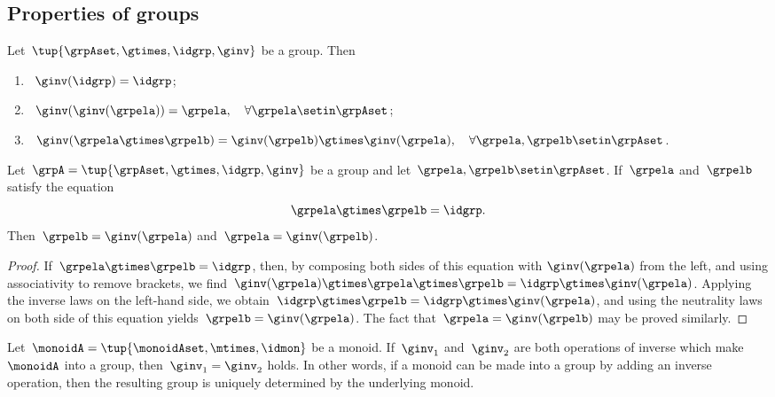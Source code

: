 
\subsection{Properties of groups}

\begin{lemma}
    \label{lem:inv-op-properties}
    Let~$\tup{\grpAset, \gtimes, \idgrp, \ginv}$ be a group.
    Then
    \begin{enumerate}
        \item\label{eq:group-neutral-invariant}~$\ginv(\idgrp) = \idgrp$;
        \item\label{eq:group-inverse-inverse}~$ \ginv(\ginv(\grpela)) = \grpela, \quad \forall \grpela \setin \grpAset$;
        \item\label{eq:group-inverse-of-composition}~$\ginv(\grpela \gtimes \grpelb ) = \ginv(\grpelb) \gtimes \ginv(\grpela), \quad \forall \grpela, \grpelb \setin \grpAset$.
    \end{enumerate}
\end{lemma}

\begin{lemma}
    \label{lem:inv-op-unique}
    Let~$\grpA = \tup{ \grpAset, \gtimes, \idgrp, \ginv }$ be a group and let~$\grpela, \grpelb \setin \grpAset$.
    If~$\grpela$ and~$\grpelb$ satisfy the equation
    \begin{equation}
        \grpela \gtimes \grpelb = \idgrp.
    \end{equation}
    Then~$\grpelb = \ginv( \grpela )$ and~$\grpela = \ginv(\grpelb)$.
\end{lemma}

\begin{proof}
    If~$\grpela \gtimes \grpelb = \idgrp$, then, by composing both sides of this equation with $\ginv(\grpela)$ from the left, and using associativity to remove brackets, we find~$\ginv(\grpela) \gtimes \grpela \gtimes \grpelb = \idgrp \gtimes \ginv(\grpela)$.
    Applying the inverse laws on the left-hand side, we obtain~$\idgrp \gtimes \grpelb = \idgrp \gtimes \ginv(\grpela)$, and using the neutrality laws on both side of this equation yields~$\grpelb =  \ginv(\grpela)$.
    The fact that~$\grpela = \ginv(\grpelb)$ may be proved similarly.
\end{proof}

\begin{corollary}
    \label{cor:inv-op-unique}
    Let~$\monoidA = \tup{\monoidAset, \mtimes,  \idmon }$ be a monoid.
    If~$\ginv_1$ and~$\ginv_2$ are both operations of inverse which make~$\monoidA$ into a group, then~$\ginv_1 =\ginv_2$ holds.
    In other words, if a monoid can be made into a group by adding an inverse operation, then the resulting group is uniquely determined by the underlying monoid.
\end{corollary}

